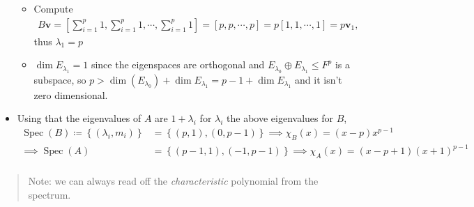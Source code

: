 \begin{solution}
\begin{itemize}
  \begin{itemize}
  \tightlist
  \item
    Compute
    \begin{align*}B\mathbf{v} = {\left[ {\sum_{i=1}^p 1, \sum_{i=1}^p 1, \cdots, \sum_{i=1}^p 1} \right]} = {\left[ {p, p, \cdots, p} \right]} = p {\left[ {1, 1, \cdots, 1} \right]} = p\mathbf{v}_1,\end{align*}
    thus \(\lambda_1 = p\)
  \item
    \(\dim E_{\lambda_1} = 1\) since the eigenspaces are orthogonal and
    \(E_{\lambda_0} \oplus E_{\lambda_1} \leq F^p\) is a subspace, so
    \(p > \dim(E_{\lambda_0}) + \dim E_{\lambda_1} = p-1 + \dim E_{\lambda_1}\)
    and it isn't zero dimensional.
  \end{itemize}
\item
  Using that the eigenvalues of \(A\) are \(1+\lambda_i\) for
  \(\lambda_i\) the above eigenvalues for \(B\),
  \begin{align*}
  \operatorname{Spec}(B) \coloneqq\left\{{(\lambda_i, m_i)}\right\} &=  \left\{{(p, 1), (0, p-1)}\right\}  \implies \chi_{B}(x) = (x-p)x^{p-1} \\ 
  \implies \operatorname{Spec}(A) &= \left\{{(p-1,1), (-1, p-1) }\right\}  \implies \chi_{A}(x) = (x- p+1)(x+1)^{p-1} \\
  \end{align*}
\end{itemize}

\begin{quote}
Note: we can always read off the \emph{characteristic} polynomial from
the spectrum.
\end{quote}


\end{solution}

